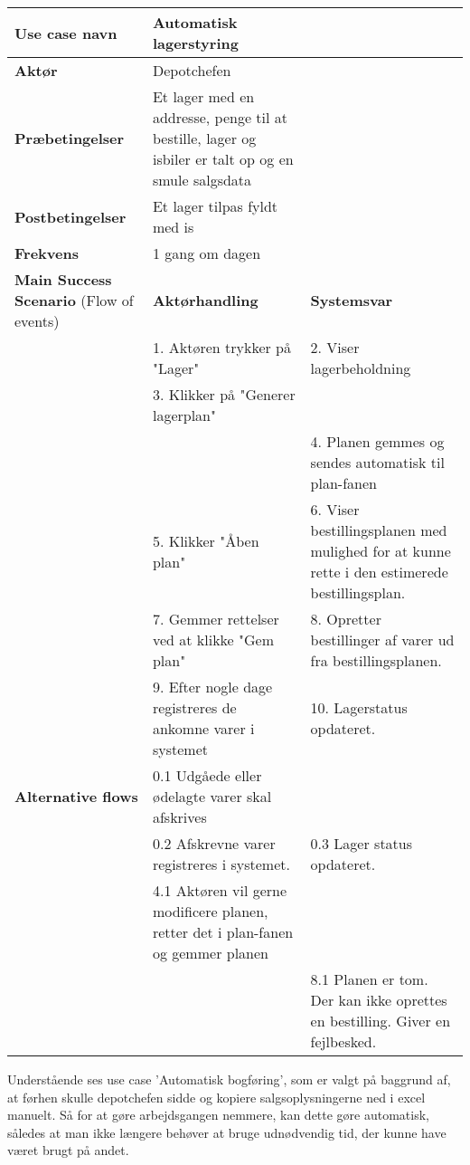 \begin{longtable}{ |p{120pt}|p{120pt}|p{120pt}| }
    \hline
    \textbf{Use case navn} & Automatisk lagerstyring & \\
    \hline
    \textbf{Aktør} & Depotchefen & \\
    \hline
    \textbf{Præbetingelser} & Et lager med en addresse, penge til at bestille, lager og isbiler er talt op og en smule salgsdata & \\
    \hline
    \textbf{Postbetingelser} & Et lager tilpas fyldt med is & \\
    \hline
    \textbf{Frekvens} & 1 gang om dagen & \\
    \hline
    \textbf{Main Success Scenario} (Flow of events) & \textbf{Aktørhandling} & \textbf{Systemsvar} \\
    \hline
    & 1. Aktøren trykker på "Lager" & 2. Viser lagerbeholdning \\
    \hline
    & 3. Klikker på "Generer lagerplan" &  \\
    & & 4. Planen gemmes og sendes automatisk til plan-fanen \\
    \hline
    & 5. Klikker "Åben plan" & 6. Viser bestillingsplanen med mulighed for at kunne rette i den estimerede bestillingsplan. \\
    \hline
    & 7. Gemmer rettelser ved at klikke "Gem plan" & 8. Opretter bestillinger af varer ud fra bestillingsplanen. \\
    \hline
    & 9. Efter nogle dage registreres de ankomne varer i systemet & 10. Lagerstatus opdateret. \\
    \hline
    \textbf{Alternative flows} & 0.1 Udgåede eller ødelagte varer skal afskrives & \\
    \hline
    & 0.2 Afskrevne varer registreres i systemet. & 0.3 Lager status opdateret. \\
    \hline
    & 4.1 Aktøren vil gerne modificere planen, retter det i plan-fanen og gemmer planen & \\
    \hline
    & & 8.1 Planen er tom. Der kan ikke oprettes en bestilling. Giver en fejlbesked. \\
    \hline
\end{longtable}


Understående ses use case 'Automatisk bogføring', som er valgt på baggrund af, at førhen skulle depotchefen sidde og kopiere salgsoplysningerne ned i excel manuelt. Så for at gøre arbejdsgangen nemmere, kan dette gøre automatisk, således at man ikke længere behøver at bruge udnødvendig tid, der kunne have været brugt på andet. 

